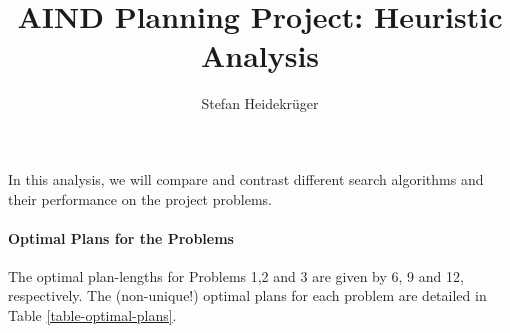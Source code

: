 \documentclass{article}
\title{AIND Planning Project: Heuristic Analysis}
\author{Stefan Heidekrüger}
\theoremstyle{plain}
\theoremstyle{definition}
\theoremstyle{remark}
\begin{document}
\maketitle



In this analysis, we will compare and contrast different search algorithms and their performance on the project problems.

\paragraph{Optimal Plans for the Problems}

The optimal plan-lengths for Problems 1,2 and 3 are given by 6, 9 and 12, respectively. The (non-unique!) optimal plans for each problem are detailed in Table \ref{table-optimal-plans}.
\end{document}
